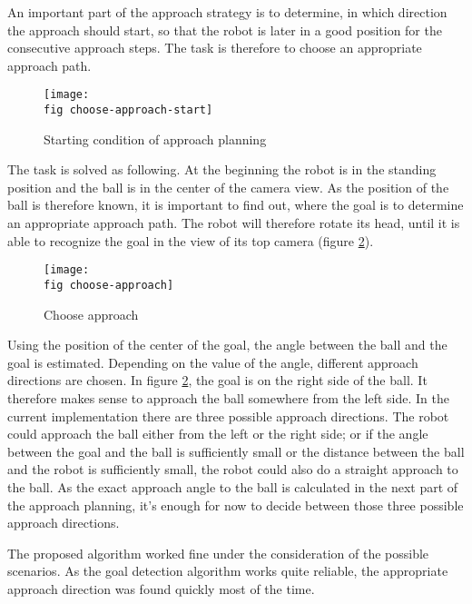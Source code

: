An important part of the approach strategy is to determine, in which direction
the approach should start, so that the robot is later in a good position for
the consecutive approach steps. The task is therefore to choose an appropriate
approach path.


\begin{figure}[ht]
  \texttt{[image: \\fig choose-approach-start]}
  \caption{Starting condition of approach planning}
  \label{j figure starting condition choose-approach}
\end{figure}

The task is solved as following. At the beginning the robot is in the standing
position and the ball is in the center of the camera view. As the position of
the ball is therefore known, it is important to find out, where the goal is to
determine an appropriate approach path. The robot will therefore rotate its
head, until it is able to recognize the goal in the view of its top camera
(figure \ref{j figure choose-approach}).

\begin{figure}[ht]
  \texttt{[image: \\fig choose-approach]}
  \caption{Choose approach}
  \label{j figure choose-approach}
\end{figure}

Using the position of the center of the goal, the angle between the ball and
the goal is estimated. Depending on the value of the angle, different approach
directions are chosen. In figure \ref{j figure choose-approach}, the goal
is on the right side of the ball. It therefore makes sense to approach the ball
somewhere from the left side. In the current implementation there are three
possible approach directions. The robot could approach the ball either from the
left or the right side; or if the angle between the goal and the ball is
sufficiently small or the distance between the ball and the robot is sufficiently small, the robot could also do a straight approach to the ball. As
the exact approach angle to the ball is calculated in the next part of the
approach planning, it's enough for now to decide between those three possible
approach directions.

The proposed algorithm worked fine under the consideration of the
possible scenarios. As the goal detection algorithm works quite reliable, the
appropriate approach direction was found quickly most of the time.


